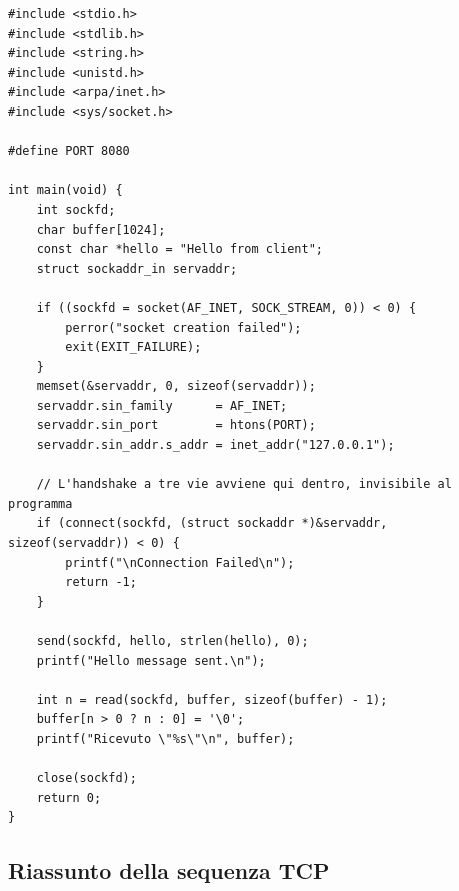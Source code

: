 \begin{lstlisting}[language={[POSIX]C}, style=wnumbers, title={tcp\_client.c}]
#include <stdio.h>
#include <stdlib.h>
#include <string.h>
#include <unistd.h>
#include <arpa/inet.h>
#include <sys/socket.h>

#define PORT 8080

int main(void) {
    int sockfd;
    char buffer[1024];
    const char *hello = "Hello from client";
    struct sockaddr_in servaddr;

    if ((sockfd = socket(AF_INET, SOCK_STREAM, 0)) < 0) {
        perror("socket creation failed");
        exit(EXIT_FAILURE);
    }
    memset(&servaddr, 0, sizeof(servaddr));
    servaddr.sin_family      = AF_INET;
    servaddr.sin_port        = htons(PORT);
    servaddr.sin_addr.s_addr = inet_addr("127.0.0.1");

    // L'handshake a tre vie avviene qui dentro, invisibile al programma
    if (connect(sockfd, (struct sockaddr *)&servaddr, sizeof(servaddr)) < 0) {
        printf("\nConnection Failed\n");
        return -1;
    }

    send(sockfd, hello, strlen(hello), 0);
    printf("Hello message sent.\n");

    int n = read(sockfd, buffer, sizeof(buffer) - 1);
    buffer[n > 0 ? n : 0] = '\0';
    printf("Ricevuto \"%s\"\n", buffer);

    close(sockfd);
    return 0;
}
\end{lstlisting}

\subsection{Riassunto della sequenza TCP}

